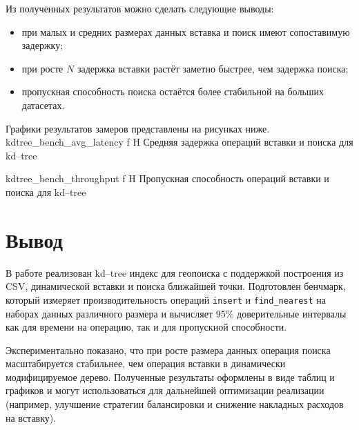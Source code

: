 \documentclass{itmo}
\begin{document}
Из полученных результатов можно сделать следующие выводы:
\begin{itemize}
	\item при малых и средних размерах данных вставка и поиск имеют сопоставимую задержку;
	\item при росте $N$ задержка вставки растёт заметно быстрее, чем задержка поиска;
	\item пропускная способность поиска остаётся более стабильной на больших датасетах.
\end{itemize}

Графики результатов замеров представлены на рисунках ниже.
	{kdtree_bench_avg_latency}
	{f}
	{H}
	{\textwidth}
	{Средняя задержка операций вставки и поиска для kd--tree}

	{kdtree_bench_throughput}
	{f}
	{H}
	{\textwidth}
	{Пропускная способность операций вставки и поиска для kd--tree}

\chapter{Вывод}

В работе реализован kd--tree индекс для геопоиска с поддержкой построения из CSV, динамической вставки и поиска ближайшей точки.
Подготовлен бенчмарк, который измеряет производительность операций \texttt{insert} и \texttt{find\_nearest} на наборах данных различного размера и вычисляет 95\% доверительные интервалы как для времени на операцию, так и для пропускной способности.

Экспериментально показано, что при росте размера данных операция поиска масштабируется стабильнее, чем операция вставки в динамически модифицируемое дерево.
Полученные результаты оформлены в виде таблиц и графиков и могут использоваться для дальнейшей оптимизации реализации (например, улучшение стратегии балансировки и снижение накладных расходов на вставку).
\end{document}
